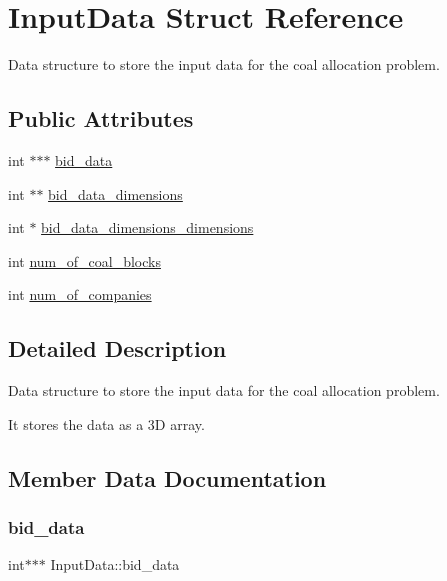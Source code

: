 \hypertarget{structInputData}{}\section{Input\+Data Struct Reference}
\label{structInputData}


Data structure to store the input data for the coal allocation problem.  


\subsection*{Public Attributes}
\begin{DoxyCompactItemize}
\item 
int $\ast$$\ast$$\ast$ \hyperlink{structInputData_a1dafb844546b53fd739be0f370676d28}{bid\+\_\+data}
\item 
int $\ast$$\ast$ \hyperlink{structInputData_abb16dba9ad2a732ace6dab1b1c9dec33}{bid\+\_\+data\+\_\+dimensions}
\item 
int $\ast$ \hyperlink{structInputData_a9ae50cca01b0b05cb38c55c328fc19fd}{bid\+\_\+data\+\_\+dimensions\+\_\+dimensions}
\item 
int \hyperlink{structInputData_a8da16cc608de69e099958cfdd162af5a}{num\+\_\+of\+\_\+coal\+\_\+blocks}
\item 
int \hyperlink{structInputData_a8b59f6e5325366bc964a42071441fa90}{num\+\_\+of\+\_\+companies}
\end{DoxyCompactItemize}


\subsection{Detailed Description}
Data structure to store the input data for the coal allocation problem. 

It stores the data as a 3D array. 

\subsection{Member Data Documentation}
\mbox{\label{structInputData_a1dafb844546b53fd739be0f370676d28}} 
\subsubsection{\texorpdfstring{bid\+\_\+data}{bid\_data}}
{\footnotesize\ttfamily int$\ast$$\ast$$\ast$ Input\+Data\+::bid\+\_\+data}

